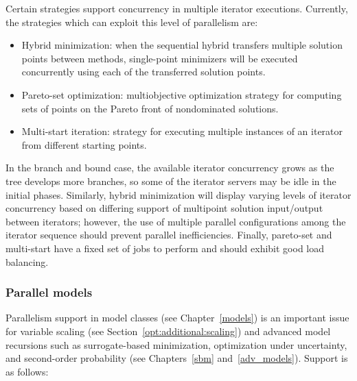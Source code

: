 Certain strategies support concurrency in multiple iterator
executions. Currently, the strategies which can exploit this level of
parallelism are:

\begin{itemize}
\item Hybrid minimization: when the sequential hybrid transfers multiple
solution points between methods, single-point minimizers will be executed
concurrently using each of the transferred solution points.


\item Pareto-set optimization: multiobjective optimization strategy for
computing sets of points on the Pareto front of nondominated solutions.

\item Multi-start iteration: strategy for executing multiple instances
of an iterator from different starting points.
\end{itemize}

In the branch and bound case, the available iterator concurrency grows
as the tree develops more branches, so some of the iterator servers
may be idle in the initial phases. Similarly, hybrid minimization will
display varying levels of iterator concurrency based on differing
support of multipoint solution input/output between iterators;
however, the use of multiple parallel configurations among the iterator
sequence should prevent parallel inefficiencies.  Finally, pareto-set
and multi-start have a fixed set of jobs to perform and should exhibit
good load balancing.

\subsubsection{Parallel models}\label{parallel:algorithms:models}

Parallelism support in model classes (see Chapter~\ref{models}) is an
important issue for variable scaling (see
Section~\ref{opt:additional:scaling}) and advanced model recursions
such as surrogate-based minimization, optimization under uncertainty,
and second-order probability (see Chapters~\ref{sbm}
and~\ref{adv_models}).  Support is as follows:

